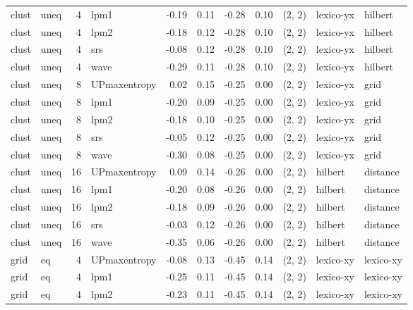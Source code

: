 \begin{tabular}{llrlrrrrlll}
 clust &  uneq &  4 &         lpm1 & -0.19 &     0.11 &  -0.28 &       0.10 & (2, 2) &   lexico-yx &    hilbert \\
 clust &  uneq &  4 &         lpm2 & -0.18 &     0.12 &  -0.28 &       0.10 & (2, 2) &   lexico-yx &    hilbert \\
 clust &  uneq &  4 &          srs & -0.08 &     0.12 &  -0.28 &       0.10 & (2, 2) &   lexico-yx &    hilbert \\
 clust &  uneq &  4 &         wave & -0.29 &     0.11 &  -0.28 &       0.10 & (2, 2) &   lexico-yx &    hilbert \\
 clust &  uneq &  8 & UPmaxentropy &  0.02 &     0.15 &  -0.25 &       0.00 & (2, 2) &   lexico-yx &       grid \\
 clust &  uneq &  8 &         lpm1 & -0.20 &     0.09 &  -0.25 &       0.00 & (2, 2) &   lexico-yx &       grid \\
 clust &  uneq &  8 &         lpm2 & -0.18 &     0.10 &  -0.25 &       0.00 & (2, 2) &   lexico-yx &       grid \\
 clust &  uneq &  8 &          srs & -0.05 &     0.12 &  -0.25 &       0.00 & (2, 2) &   lexico-yx &       grid \\
 clust &  uneq &  8 &         wave & -0.30 &     0.08 &  -0.25 &       0.00 & (2, 2) &   lexico-yx &       grid \\
 clust &  uneq & 16 & UPmaxentropy &  0.09 &     0.14 &  -0.26 &       0.00 & (2, 2) &     hilbert & distance \\
 clust &  uneq & 16 &         lpm1 & -0.20 &     0.08 &  -0.26 &       0.00 & (2, 2) &     hilbert & distance \\
 clust &  uneq & 16 &         lpm2 & -0.18 &     0.09 &  -0.26 &       0.00 & (2, 2) &     hilbert & distance \\
 clust &  uneq & 16 &          srs & -0.03 &     0.12 &  -0.26 &       0.00 & (2, 2) &     hilbert & distance \\
 clust &  uneq & 16 &         wave & -0.35 &     0.06 &  -0.26 &       0.00 & (2, 2) &     hilbert & distance \\
  grid &    eq &  4 & UPmaxentropy & -0.08 &     0.13 &  -0.45 &       0.14 & (2, 2) &   lexico-xy &  lexico-xy \\
  grid &    eq &  4 &         lpm1 & -0.25 &     0.11 &  -0.45 &       0.14 & (2, 2) &   lexico-xy &  lexico-xy \\
  grid &    eq &  4 &         lpm2 & -0.23 &     0.11 &  -0.45 &       0.14 & (2, 2) &   lexico-xy &  lexico-xy \\

\end{tabular}
